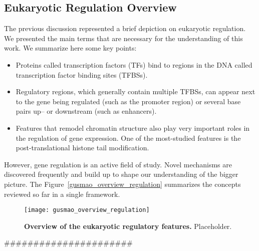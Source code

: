 \subsection{Eukaryotic Regulation Overview}
\label{sec:eukaryotic.regulation.overview}

The previous discussion represented a brief depiction on eukaryotic regulation. We presented the main terms that are necessary for the understanding of this work. We summarize here some key points:

\begin{itemize}
  \item Proteins called transcription factors (TFs) bind to regions in the DNA called transcription factor binding sites (TFBSs).
  \item Regulatory regions, which generally contain multiple TFBSs, can appear next to the gene being regulated (such as the promoter region) or several base pairs up-- or downstream (such as enhancers).
  \item Features that remodel chromatin structure also play very important roles in the regulation of gene expression. One of the most-studied features is the post-translational histone tail modification.
\end{itemize}

However, gene regulation is an active field of study. Novel mechanisms are discovered frequently and build up to shape our understanding of the bigger picture. The Figure~\ref{gusmao_overview_regulation} summarizes the concepts reviewed so far in a single framework.

\begin{figure}[h!]
\centering
\texttt{[image: gusmao\_overview\_regulation]}
\caption[Overview of the eukaryotic regulatory features]{\textbf{Overview of the eukaryotic regulatory features.} Placeholder.}
\label{fig:gusmao_overview_regulation}
\end{figure}




######################



